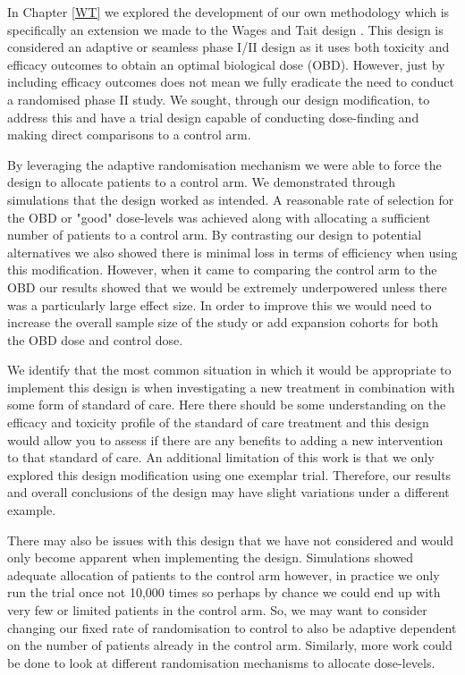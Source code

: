 In Chapter \ref{WT} we explored the development of our own methodology which is specifically an extension we made to the Wages and Tait design \cite{wagesSeamlessPhaseII2015}. This design is considered an adaptive or seamless phase \RN{1}/\RN{2} design as it uses both toxicity and efficacy outcomes to obtain an optimal biological dose (OBD). However, just by including efficacy outcomes does not mean we fully eradicate the need to conduct a randomised phase \RN{2} study. We sought, through our design modification, to address this and have a trial design capable of conducting dose-finding and making direct comparisons to a control arm. 

By leveraging the adaptive randomisation mechanism we were able to force the design to allocate patients to a control arm. We demonstrated through simulations that the design worked as intended. A reasonable rate of selection for the OBD or "good" dose-levels was achieved along with allocating a sufficient number of patients to a control arm. By contrasting our design to potential alternatives we also showed there is minimal loss in terms of efficiency when using this modification. However, when it came to comparing the control arm to the OBD our results showed that we would be extremely underpowered unless there was a particularly large effect size. In order to improve this we would need to increase the overall sample size of the study or add expansion cohorts for both the OBD dose and control dose.   

We identify that the most common situation in which it would be appropriate to implement this design is when investigating a new treatment in combination with some form of standard of care. Here there should be some understanding on the efficacy and toxicity profile of the standard of care treatment and this design would allow you to assess if there are any benefits to adding a new intervention to that standard of care. An additional limitation of this work is that we only explored this design modification using one exemplar trial. Therefore, our results and overall conclusions of the design may have slight variations under a different example. 

There may also be issues with this design that we have not considered and would only become apparent when implementing the design. Simulations showed adequate allocation of patients to the control arm however, in practice we only run the trial once not 10,000 times so perhaps by chance we could end up with very few or limited patients in the control arm. So, we may want to consider changing our fixed rate of randomisation to control to also be adaptive dependent on the number of patients already in the control arm. Similarly, more work could be done to look at different randomisation mechanisms to allocate dose-levels. 

